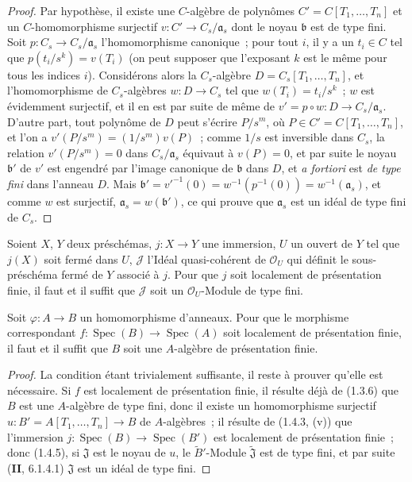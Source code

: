 \begin{proof}
Par hypothèse, il existe une $C$-algèbre de polynômes
$C'=C[T_1,\ldots,T_n]$ et un $C$-homomorphisme surjectif
$v:C'\to C_s/\mathfrak a_s$ dont le noyau $\mathfrak b$ est de type fini.
Soit $p:C_s\to C_s/\mathfrak a_s$ l'homomorphisme canonique~; pour tout $i$,
il y a un $t_i\in C$ tel que $p(t_i/s^k)=v(T_i)$ (on peut supposer que
l'exposant $k$ est le même pour tous les indices $i$). Considérons alors la
$C_s$-algèbre $D=C_s[T_1,\ldots,T_n]$, et l'homomorphisme de $C_s$-algèbres
$w:D\to C_s$ tel que $w(T_i)=t_i/s^k$~; $w$ est évidemment surjectif, et il
en est par suite de même de $v'=p\circ w:D\to C_s/\mathfrak a_s$. D'autre
part, tout polynôme de $D$ peut s'écrire $P/s^m$, où
$P\in C'=C[T_1,\ldots,T_n]$, et l'on a
$v'(P/s^m)=(1/s^m)v(P)$~; comme $1/s$ est inversible dans $C_s$, la relation
$v'(P/s^m)=0$ dans $C_s/\mathfrak a_s$ équivaut à $v(P)=0$, et par suite le
noyau $\mathfrak b'$ de $v'$ est engendré par l'image canonique de
$\mathfrak b$ dans $D$, et \emph{a fortiori} est \emph{de type fini} dans l'anneau
$D$. Mais
$\mathfrak b'=v'^{-1}(0)=w^{-1}(p^{-1}(0))=w^{-1}(\mathfrak a_s)$, et comme
$w$ est surjectif, $\mathfrak a_s=w(\mathfrak b')$, ce qui prouve que
$\mathfrak a_s$ est un idéal de type fini de $C_s$.
\end{proof}

\begin{corollary}[1.4.5]
\label{IV.1.4.5-fr}
Soient $X$, $Y$ deux préschémas, $j:X\to Y$ une immersion, $U$ un ouvert de
$Y$ tel que $j(X)$ soit fermé dans $U$, $\mathcal J$ l'Idéal quasi-cohérent de
$\mathcal O_U$ qui définit le sous-préschéma fermé de $Y$ associé à $j$. Pour
que $j$ soit localement de présentation finie, il faut et il suffit que
$\mathcal J$ soit un $\mathcal O_U$-Module de type fini.
\end{corollary}

\par\medskip\noindent
\begin{proposition}[1.4.6]
\label{IV.1.4.6-fr}
Soit $\varphi:A\to B$ un homomorphisme d'anneaux. Pour que le morphisme
correspondant $f:\operatorname{Spec}(B)\to\operatorname{Spec}(A)$ soit localement de présentation finie,
il faut et il suffit que $B$ soit une $A$-algèbre de présentation finie.
\end{proposition}

\begin{proof}
La condition étant trivialement suffisante, il reste à prouver qu'elle est
nécessaire. Si $f$ est localement de présentation finie, il résulte déjà de
(1.3.6) que $B$ est une $A$-algèbre de type fini, donc il existe un
homomorphisme surjectif $u:B'=A[T_1,\ldots,T_n]\to B$ de $A$-algèbres~; il
résulte de (1.4.3, (v)) que l'immersion
$j:\operatorname{Spec}(B)\to\operatorname{Spec}(B')$ est localement
de présentation finie~; donc (1.4.5), si $\mathfrak J$ est le noyau de $u$,
le $\widetilde{B}'$-Module $\widetilde{\mathfrak J}$ est de type fini, et par
suite (\textbf{II}, 6.1.4.1) $\mathfrak J$ est un idéal de type fini.
\end{proof}

